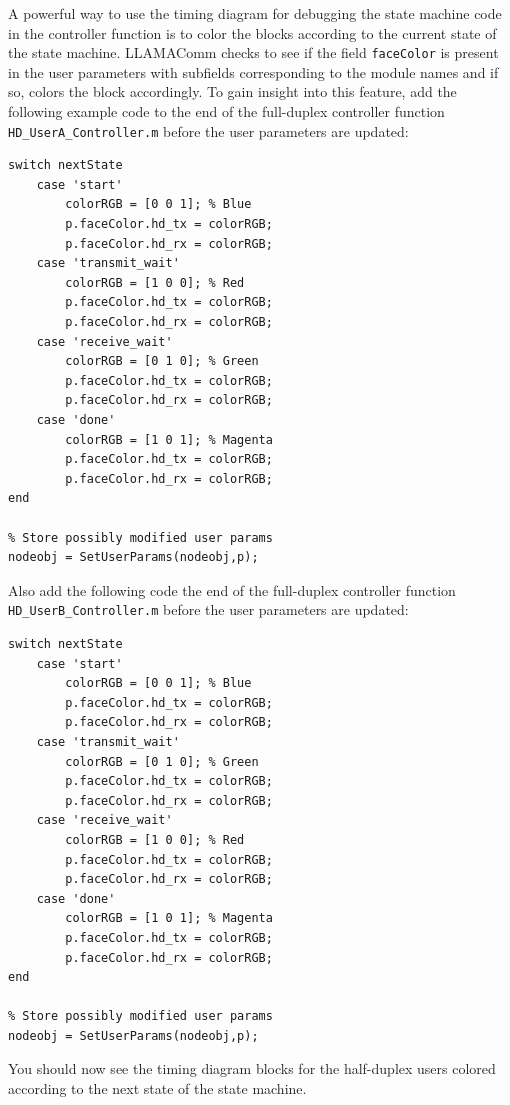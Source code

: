 A powerful way to use the timing diagram for debugging the state machine code in the controller function is to color the blocks according to the current state of the state machine.  LLAMAComm checks to see if the field \verb+faceColor+ is present in the user parameters with subfields corresponding to the module names and if so, colors the block accordingly.  To gain insight into this feature, add the following example code to the end of the full-duplex controller function \verb+HD_UserA_Controller.m+ before the user parameters are updated:
%
\begin{lstlisting}[numbers=none]
% Update the timing diagram color for half-duplex user A
switch nextState
    case 'start'
        colorRGB = [0 0 1]; % Blue
        p.faceColor.hd_tx = colorRGB;
        p.faceColor.hd_rx = colorRGB;
    case 'transmit_wait'
        colorRGB = [1 0 0]; % Red
        p.faceColor.hd_tx = colorRGB;
        p.faceColor.hd_rx = colorRGB;
    case 'receive_wait'
        colorRGB = [0 1 0]; % Green
        p.faceColor.hd_tx = colorRGB;
        p.faceColor.hd_rx = colorRGB;
    case 'done'
        colorRGB = [1 0 1]; % Magenta
        p.faceColor.hd_tx = colorRGB;
        p.faceColor.hd_rx = colorRGB;
end

% Store possibly modified user params
nodeobj = SetUserParams(nodeobj,p);
\end{lstlisting}
%
Also add the following code the end of the full-duplex controller function \verb+HD_UserB_Controller.m+ before the user parameters are updated:
%
\begin{lstlisting}[numbers=none]
% Update the timing diagram color for half-duplex user B
switch nextState
    case 'start'
        colorRGB = [0 0 1]; % Blue
        p.faceColor.hd_tx = colorRGB;
        p.faceColor.hd_rx = colorRGB;
    case 'transmit_wait'
        colorRGB = [0 1 0]; % Green
        p.faceColor.hd_tx = colorRGB;
        p.faceColor.hd_rx = colorRGB;
    case 'receive_wait'
        colorRGB = [1 0 0]; % Red
        p.faceColor.hd_tx = colorRGB;
        p.faceColor.hd_rx = colorRGB;
    case 'done'
        colorRGB = [1 0 1]; % Magenta
        p.faceColor.hd_tx = colorRGB;
        p.faceColor.hd_rx = colorRGB;
end

% Store possibly modified user params
nodeobj = SetUserParams(nodeobj,p);
\end{lstlisting}
%
You should now see the timing diagram blocks for the half-duplex users colored according to the next state of the state machine.

